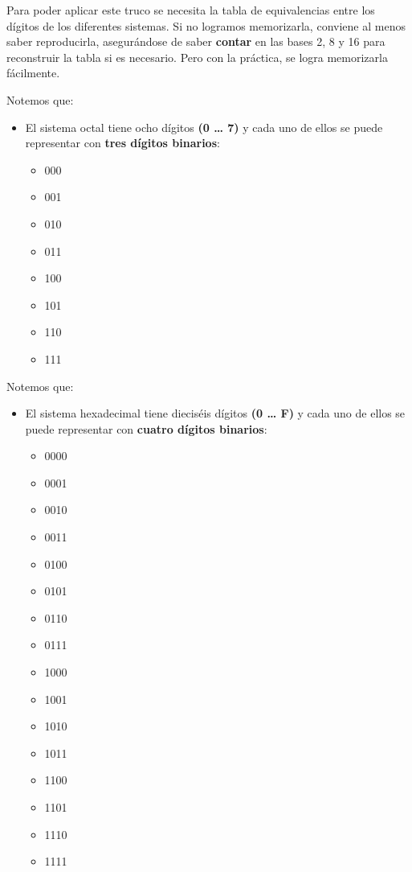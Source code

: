 \documentclass[spanish,A4,]{article}
\begin{document}
Para poder aplicar este truco se necesita la tabla de equivalencias
entre los dígitos de los diferentes sistemas. Si no logramos
memorizarla, conviene al menos saber reproducirla, asegurándose de saber
\textbf{contar} en las bases 2, 8 y 16 para reconstruir la tabla si es
necesario. Pero con la práctica, se logra memorizarla fácilmente.

Notemos que:

\begin{itemize}
\itemsep1pt\parskip0pt
\item
  El sistema octal tiene ocho dígitos \textbf{(0 \ldots{} 7)} y cada uno
  de ellos se puede representar con \textbf{tres dígitos binarios}:

  \begin{itemize}
  \itemsep1pt\parskip0pt
  \item
    000
  \item
    001
  \item
    010
  \item
    011
  \item
    100
  \item
    101
  \item
    110
  \item
    111
  \end{itemize}
\end{itemize}

Notemos que:

\begin{itemize}
\itemsep1pt\parskip0pt
\item
  El sistema hexadecimal tiene dieciséis dígitos \textbf{(0 \ldots{} F)}
  y cada uno de ellos se puede representar con \textbf{cuatro dígitos
  binarios}:

  \begin{itemize}
  \itemsep1pt\parskip0pt
  \item
    0000
  \item
    0001
  \item
    0010
  \item
    0011
  \item
    0100
  \item
    0101
  \item
    0110
  \item
    0111
  \item
    1000
  \item
    1001
  \item
    1010
  \item
    1011
  \item
    1100
  \item
    1101
  \item
    1110
  \item
    1111
  \end{itemize}
\end{itemize}
\end{document}

